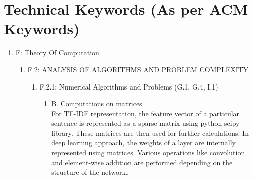 \documentclass[oneside,a4paper,12pt]{book}
\begin{document}
\section{Technical Keywords (As per ACM Keywords)}
\begin{enumerate}
	\item[] F: Theory Of Computation 
	\begin{enumerate}
		\item[] F.2: ANALYSIS OF ALGORITHMS AND PROBLEM COMPLEXITY 
		\begin{enumerate}
			\item[] F.2.1: Numerical Algorithms and Problems (G.1, G.4, I.1) 
			\begin{enumerate}
				\item[]  B. Computations on matrices \\
						For TF-IDF representation, the feature vector of a particular sentence is represented as a sparse matrix using python scipy library. These matrices are then used for further calculations. In deep learning approach, the weights of a layer are internally represented using matrices. Various operations like convolution and element-wise addition are performed depending on the structure of the network. 
			\end{enumerate}
		\end{enumerate}
		

\end{enumerate}
\end{enumerate}
\end{document}

